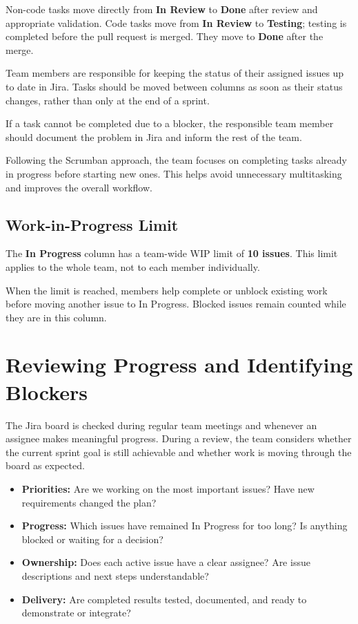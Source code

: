 \documentclass[12pt,a4paper]{article}
\begin{document}
Non-code tasks move directly from \textbf{In Review} to \textbf{Done}
after review and appropriate validation. Code tasks move from
\textbf{In Review} to \textbf{Testing}; testing is completed before the
pull request is merged. They move to \textbf{Done} after the merge.

Team members are responsible for keeping the status
of their assigned issues up to date in Jira.
Tasks should be moved between columns as soon as
their status changes, rather than only at the end
of a sprint.

If a task cannot be completed due to a blocker,
the responsible team member should document the
problem in Jira and inform the rest of the team.

Following the Scrumban approach, the team focuses
on completing tasks already in progress before
starting new ones. This helps avoid unnecessary
multitasking and improves the overall workflow.

\subsection{Work-in-Progress Limit}

The \textbf{In Progress} column has a team-wide WIP limit
of \textbf{10 issues}. This limit applies to the whole team,
not to each member individually.

When the limit is reached, members help complete or unblock
existing work before moving another issue to In Progress.
Blocked issues remain counted while they are in this column.



\section{Reviewing Progress and Identifying Blockers}

The Jira board is checked during regular team meetings and whenever an
assignee makes meaningful progress. During a review, the team considers
whether the current sprint goal is still achievable and whether work is
moving through the board as expected.

\begin{itemize}
    \item \textbf{Priorities:} Are we working on the most important issues?
    Have new requirements changed the plan?
    \item \textbf{Progress:} Which issues have remained In Progress for too
    long? Is anything blocked or waiting for a decision?
    \item \textbf{Ownership:} Does each active issue have a clear assignee?
    Are issue descriptions and next steps understandable?
    \item \textbf{Delivery:} Are completed results tested, documented, and
    ready to demonstrate or integrate?
\end{itemize}
\end{document}
